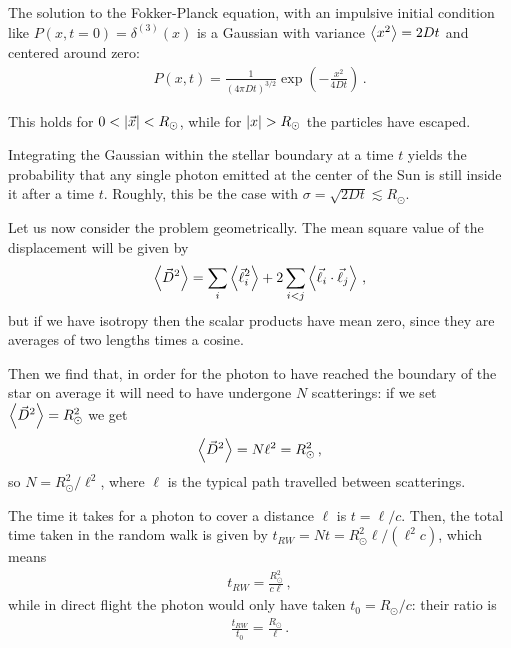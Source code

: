 \documentclass[main.tex]{subfiles}
\begin{document}

The solution to the Fokker-Planck equation, with an impulsive initial condition like \(P(x, t=0) = \delta^{(3)} (x)\) is a Gaussian with variance \(\expval{x^2} =  2 D t\) and centered around zero: 
%
\begin{align}
P(x, t) = \frac{1}{(4 \pi D t)^{3/2}} \exp(- \frac{x^2}{ 4 D t})
\,.
\end{align}

This holds for \(0 < \abs{\vec{x}} < R_{\odot}\), while for \(\abs{x} > R_{\odot}\) the particles have escaped. 

Integrating the Gaussian within the stellar boundary at a time \(t\) yields the probability that any single photon emitted at the center of the Sun is still inside it after a time \(t\). 
Roughly, this be the case with  \(\sigma = \sqrt{2 Dt } \lesssim R_{\odot} \).


Let us now consider the problem geometrically. The mean square value of the displacement will be given by
%
\begin{align}
  \expval{\vec{D}^2} = \sum _{i} \expval{\vec{\ell}_{i}^2} 
  + 2\sum _{i<j} \expval{\vec{\ell}_i \cdot \vec{\ell}_j}
\,,
\end{align}
%
but if we have isotropy then the scalar products have mean zero, since they are averages of two lengths times a cosine.

Then we find that, in order for the photon to have reached the boundary of the star on average it will need to have undergone \(N\) scatterings: if we set \(\expval{\vec{D}^2} = R_{\odot}^2\) we get
%
\begin{align}
  \expval{\vec{D}^2} = N \ell^2 = R _{\odot}^2
\,,
\end{align}
%
so \(N = R _{\odot}^2 / \ell^2\), where \(\ell\) is the typical path travelled between scatterings. 

The time it takes for a photon to cover a distance \(\ell\) is \(t= \ell/c\). 
Then, the total time taken in the random walk is given by \(t_{RW} = Nt = R^2 _{\odot} \ell / (\ell^2 c)\), which means 
%
\begin{align}
  t_{RW} = \frac{R _{\odot}^2}{c \ell}
\,,
\end{align}
%
while in direct flight the photon would only have taken \(t_0 = R _{\odot}/ c\): their ratio is 
%
\begin{align}
  \frac{t_{RW}}{t_0 } = \frac{R _{\odot}}{ \ell}
\,.
\end{align}
\end{document}
